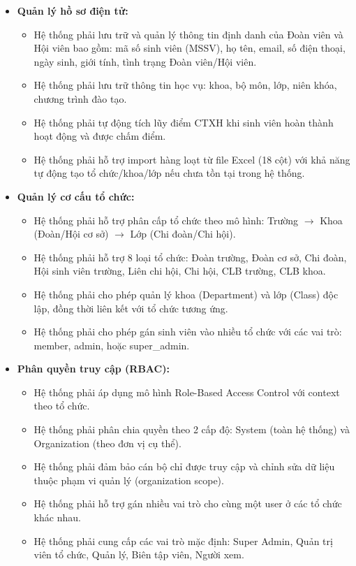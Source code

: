 \begin{itemize}
    \item \textbf{Quản lý hồ sơ điện tử:}
    \begin{itemize}
        \item Hệ thống phải lưu trữ và quản lý thông tin định danh của Đoàn viên và Hội viên bao gồm: mã số sinh viên (MSSV), họ tên, email, số điện thoại, ngày sinh, giới tính, tình trạng Đoàn viên/Hội viên.
        \item Hệ thống phải lưu trữ thông tin học vụ: khoa, bộ môn, lớp, niên khóa, chương trình đào tạo.
        \item Hệ thống phải tự động tích lũy điểm CTXH khi sinh viên hoàn thành hoạt động và được chấm điểm.
        \item Hệ thống phải hỗ trợ import hàng loạt từ file Excel (18 cột) với khả năng tự động tạo tổ chức/khoa/lớp nếu chưa tồn tại trong hệ thống.
    \end{itemize}
    
    \item \textbf{Quản lý cơ cấu tổ chức:}
    \begin{itemize}
        \item Hệ thống phải hỗ trợ phân cấp tổ chức theo mô hình: Trường $\rightarrow$ Khoa (Đoàn/Hội cơ sở) $\rightarrow$ Lớp (Chi đoàn/Chi hội).
        \item Hệ thống phải hỗ trợ 8 loại tổ chức: Đoàn trường, Đoàn cơ sở, Chi đoàn, Hội sinh viên trường, Liên chi hội, Chi hội, CLB trường, CLB khoa.
        \item Hệ thống phải cho phép quản lý khoa (Department) và lớp (Class) độc lập, đồng thời liên kết với tổ chức tương ứng.
        \item Hệ thống phải cho phép gán sinh viên vào nhiều tổ chức với các vai trò: member, admin, hoặc super\_admin.
    \end{itemize}
    
    \item \textbf{Phân quyền truy cập (RBAC):}
    \begin{itemize}
        \item Hệ thống phải áp dụng mô hình Role-Based Access Control với context theo tổ chức.
        \item Hệ thống phải phân chia quyền theo 2 cấp độ: System (toàn hệ thống) và Organization (theo đơn vị cụ thể).
        \item Hệ thống phải đảm bảo cán bộ chỉ được truy cập và chỉnh sửa dữ liệu thuộc phạm vi quản lý (organization scope).
        \item Hệ thống phải hỗ trợ gán nhiều vai trò cho cùng một user ở các tổ chức khác nhau.
        \item Hệ thống phải cung cấp các vai trò mặc định: Super Admin, Quản trị viên tổ chức, Quản lý, Biên tập viên, Người xem.
    \end{itemize}
\end{itemize}

